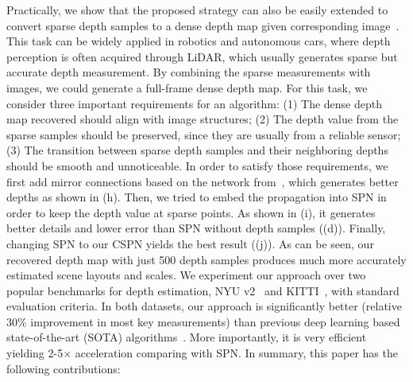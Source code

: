 Practically, we show that the proposed strategy can also be easily extended to convert sparse depth samples to a dense depth map given corresponding image~\cite{LiaoHWKYL16,Ma2017SparseToDense}.  This task can be widely applied in robotics and autonomous cars, where depth perception is often acquired through LiDAR, which usually generates sparse but accurate depth measurement. By combining the sparse measurements with images, we could generate a full-frame dense depth map.
For this task, we consider three important requirements for an algorithm: 
(1) The dense depth map recovered should align with image structures;
(2) The depth value from the sparse samples should be preserved, since they are usually from a reliable sensor;
(3) The transition between sparse depth samples and their neighboring depths should be smooth and unnoticeable.  
In order to satisfy those requirements, we first add mirror connections based on the network from~\cite{Ma2017SparseToDense}, which generates better depths as shown in (h). Then, we tried to embed the propagation into SPN in order to keep the depth value at sparse points. As shown in (i), it generates better details and lower error than SPN without depth samples ((d)). Finally, changing SPN to our CSPN yields the best result ((j)). 
As can be seen, our recovered depth map with just 500 depth samples produces much more accurately estimated scene layouts and scales. 
We experiment our approach over two popular benchmarks for depth estimation, \ie NYU v2~\cite{silberman2012indoor} and KITTI~\cite{geiger2012we}, with standard evaluation criteria. In both datasets, our approach is significantly better (relative $30\%$ improvement in most key measurements) than previous deep learning based state-of-the-art (SOTA) algorithms~\cite{LiaoHWKYL16,Ma2017SparseToDense}. More importantly, it is very efficient yielding 2-5$\times$ acceleration comparing with SPN. In summary, this paper has the following contributions: 
